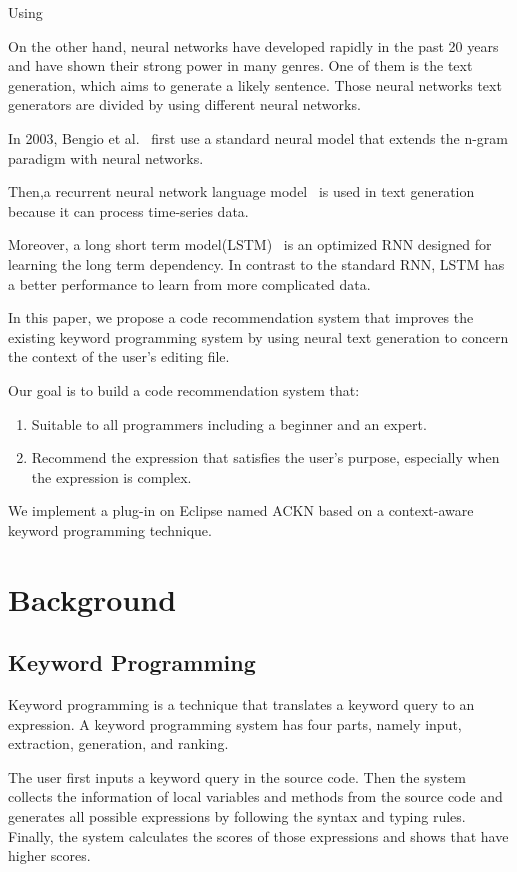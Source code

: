 \documentclass[PRO,english]{ipsj}
\begin{document}
Using 

On the other hand, neural networks have developed rapidly in the past 20 years and have shown their strong power in many genres. One of them is the text generation, which aims to generate a likely sentence. Those neural networks text generators are divided by using different neural networks.~\cite{NNTG}

In 2003, Bengio et al.~\cite{Bengio} first use a standard neural model that extends the n-gram paradigm with neural networks. 

Then,a recurrent neural network language model~\cite{RNN} is used in text generation because it can process time-series data.

Moreover, a long short term model(LSTM)~\cite{LSTM} is an optimized RNN designed for learning the long term dependency. In contrast to the standard RNN, LSTM has a better performance to learn from more complicated data.
		
In this paper, we propose a code recommendation system that improves the existing keyword programming system by using neural text generation to concern the context of the user’s editing file.

Our goal is to build a code recommendation system that:
\begin{enumerate}
\item Suitable to all programmers including a beginner and an expert.
\item Recommend the expression that satisfies the user’s purpose, especially when the expression is complex.
\end{enumerate}

We implement a plug-in on Eclipse named ACKN based on a context-aware keyword programming technique. 

\section{Background}
\subsection{Keyword Programming}
Keyword programming is a technique that translates a keyword query to an expression. A keyword programming system has four parts, namely input, extraction, generation, and ranking. 

The user first inputs a keyword query in the source code. Then the system collects the information of local variables and methods from the source code and generates all possible expressions by following the syntax and typing rules. Finally, the system calculates the scores of those expressions and shows that have higher scores.
\end{document}
